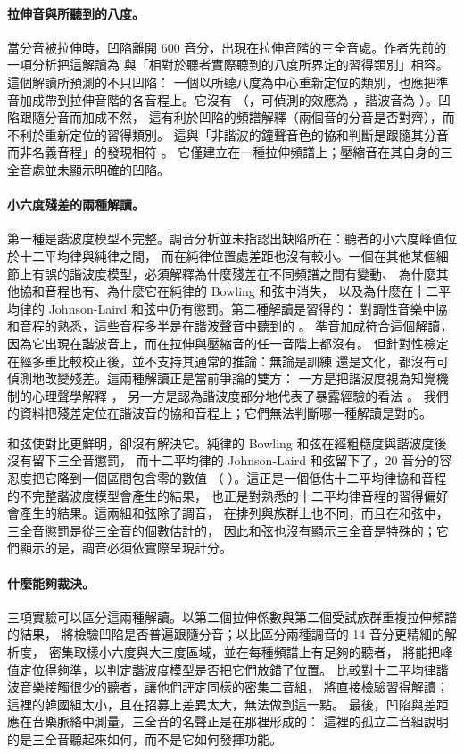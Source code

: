 \documentclass[11pt,a4paper]{article}
\begin{document}
\paragraph{拉伸音與所聽到的八度。}
當分音被拉伸時，凹陷離開 600 音分，出現在拉伸音階的三全音處。作者先前的一項分析把這解讀為
與「相對於聽者實際聽到的八度所界定的習得類別」相容。這個解讀所預測的不只凹陷：
一個以所聽八度為中心重新定位的類別，也應把準音加成帶到拉伸音階的各音程上。它沒有
（\sbOwnStr，可偵測的效應為 \sbMdeStr，諧波音為 \sbOwnHarm）。凹陷跟隨分音而加成不然，
這有利於凹陷的頻譜解釋（兩個音的分音是否對齊），而不利於重新定位的習得類別。
這與「非諧波的鐘聲音色的協和判斷是跟隨其分音而非名義音程」的發現相符 \citep{harrison2024carillon}。
它僅建立在一種拉伸頻譜上；壓縮音在其自身的三全音處並未顯示明確的凹陷。

\paragraph{小六度殘差的兩種解讀。}
第一種是諧波度模型不完整。調音分析並未指認出缺陷所在：聽者的小六度峰值位於十二平均律與純律之間，
而在純律位置處差距也沒有較小。一個在其他某個細節上有誤的諧波度模型，必須解釋為什麼殘差在不同頻譜之間有變動、
為什麼其他協和音程也有、為什麼它在純律的 Bowling 和弦中消失，
以及為什麼在十二平均律的 Johnson-Laird 和弦中仍有懲罰。第二種解讀是習得的：
對調性音樂中協和音程的熟悉，這些音程多半是在諧波聲音中聽到的 \citep{lahdelma2022,mcdermott2016}。
準音加成符合這個解讀，因為它出現在諧波音上，而在拉伸與壓縮音的任一音階上都沒有。
但針對性檢定在經多重比較校正後，並不支持其通常的推論：無論是訓練 \citep[參見][]{mcdermott2010,popescu2019}
還是文化，都沒有可偵測地改變殘差。這兩種解讀正是當前爭論的雙方：
一方是把諧波度視為知覺機制的心理聲學解釋 \citep{harrison2020,marjieh2024}，
另一方是認為諧波度部分地代表了暴露經驗的看法 \citep{lahdelma2022,milne2023}。
我們的資料把殘差定位在諧波音的協和音程上；它們無法判斷哪一種解讀是對的。

和弦使對比更鮮明，卻沒有解決它。純律的 Bowling 和弦在經粗糙度與諧波度後沒有留下三全音懲罰，
而十二平均律的 Johnson-Laird 和弦留下了，20 音分的容忍度把它降到一個區間包含零的數值
（\csJLTwenty{} \csJLTwentyCI）。這正是一個低估十二平均律協和音程的不完整諧波度模型會產生的結果，
也正是對熟悉的十二平均律音程的習得偏好會產生的結果。這兩組和弦除了調音，
在排列與族群上也不同，而且在和弦中，三全音懲罰是從三全音的個數估計的，
因此和弦也沒有顯示三全音是特殊的；它們顯示的是，調音必須依實際呈現計分。

\paragraph{什麼能夠裁決。}
三項實驗可以區分這兩種解讀。以第二個拉伸係數與第二個受試族群重複拉伸頻譜的結果，
將檢驗凹陷是否普遍跟隨分音；以比區分兩種調音的 14 音分更精細的解析度，
密集取樣小六度與大三度區域，並在每種頻譜上有足夠的聽者，
將能把峰值定位得夠準，以判定諧波度模型是否把它們放錯了位置。
比較對十二平均律諧波音樂接觸很少的聽者，讓他們評定同樣的密集二音組，
將直接檢驗習得解讀；這裡的韓國組太小，且在招募上差異太大，無法做到這一點。
最後，凹陷與差距應在音樂脈絡中測量，三全音的名聲正是在那裡形成的：
這裡的孤立二音組說明的是三全音聽起來如何，而不是它如何發揮功能。
\end{document}
